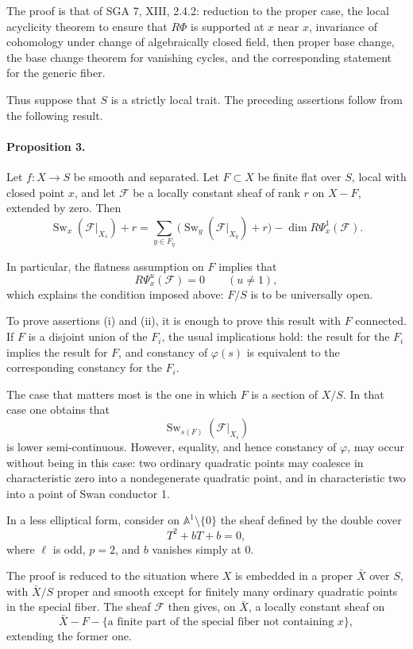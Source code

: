 \documentclass[11pt]{article}
\newcommand{\F}{\mathcal F}
\DeclareMathOperator{\Sw}{Sw}
\begin{document}
The proof is that of SGA 7, XIII, 2.4.2: reduction to the proper case, the local acyclicity theorem to ensure that \(R\Phi\) is supported at \(x\) near \(x\), invariance of cohomology under change of algebraically closed field, then proper base change, the base change theorem for vanishing cycles, and the corresponding statement for the generic fiber.

Thus suppose that \(S\) is a strictly local trait. The preceding assertions follow from the following result.

\paragraph{Proposition 3.}
Let \(f:X\to S\) be smooth and separated. Let \(F\subset X\) be finite flat over \(S\), local with closed point \(x\), and let \(\F\) be a locally constant sheaf of rank \(r\) on \(X-F\), extended by zero. Then
\[
\Sw_x(\F|_{X_{\bar s}})+r
=
\sum_{y\in F_{\bar\eta}}
\bigl(\Sw_y(\F|_{X_{\bar\eta}})+r\bigr)
-
\dim R\Psi_x^1(\F).
\]

In particular, the flatness assumption on \(F\) implies that
\[
  R\Psi_x^u(\F)=0\qquad (u\ne 1),
\]
which explains the condition imposed above: \(F/S\) is to be universally open.

To prove assertions (i) and (ii), it is enough to prove this result with \(F\) connected. If \(F\) is a disjoint union of the \(F_i\), the usual implications hold: the result for the \(F_i\) implies the result for \(F\), and constancy of \(\varphi(s)\) is equivalent to the corresponding constancy for the \(F_i\).

The case that matters most is the one in which \(F\) is a section of \(X/S\). In that case one obtains that
\[
  \Sw_{s(F)}(\F|_{X_{\bar s}})
\]
is lower semi-continuous. However, equality, and hence constancy of \(\varphi\), may occur without being in this case: two ordinary quadratic points may coalesce in characteristic zero into a nondegenerate quadratic point, and in characteristic two into a point of Swan conductor 1.

In a less elliptical form, consider on \(\mathbb A^1\setminus\{0\}\) the sheaf defined by the double cover
\[
  T^2+bT+b=0,
\]
where \(\ell\) is odd, \(p=2\), and \(b\) vanishes simply at \(0\).

The proof is reduced to the situation where \(X\) is embedded in a proper \(\bar X\) over \(S\), with \(\bar X/S\) proper and smooth except for finitely many ordinary quadratic points in the special fiber. The sheaf \(\F\) then gives, on \(\bar X\), a locally constant sheaf on
\[
  \bar X-F-\{
  \text{a finite part of the special fiber not containing }x
  \},
\]
extending the former one.
\end{document}
